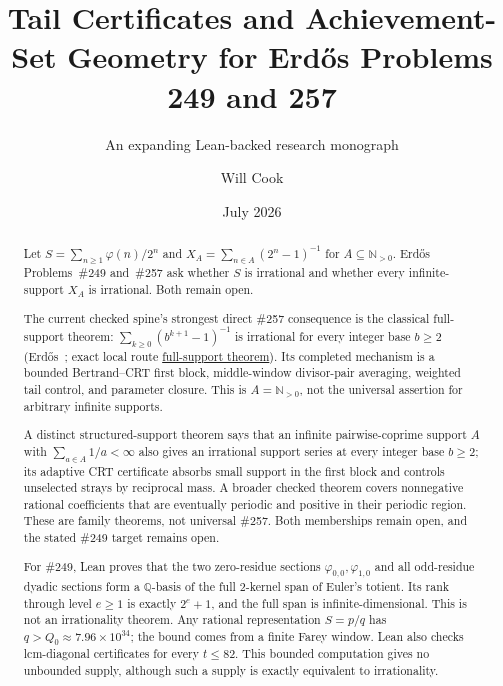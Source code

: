 \documentclass[11pt]{article}
\title{Tail Certificates and Achievement-Set Geometry for Erd\H{o}s Problems 249 and 257}
\subtitle{An expanding Lean-backed research monograph}
\author{Will Cook}
\date{July 2026}
\newcommand{\commit}{99f4bf47422abbd8757cbb22b50ba079d764d3a7}
\newcommand{\repobase}{https://github.com/wcook04/plectis-erdos/blob/\commit}
\newcommand{\PK}{Erdos249257}
\newcommand{\lword}[4]{\href{\repobase/\PK/#1\#L#2}{#4}}
\theoremstyle{definition}
\theoremstyle{remark}
\newcommand{\Npos}{\mathbb{N}_{>0}}
\newcommand{\Q}{\mathbb{Q}}
\newcommand{\ph}{\varphi}
\newcommand{\Qzero}{Q_0}
\begin{document}
\maketitle
{}

\begin{abstract}
\noindent
Let $S=\sum_{n\ge1}\ph(n)/2^n$ and
$X_A=\sum_{n\in A}(2^n-1)^{-1}$ for $A\subseteq\Npos$. Erd\H{o}s
Problems~\#249 and~\#257 ask whether $S$ is irrational and whether every
infinite-support $X_A$ is irrational. Both remain open.

The current checked spine's strongest direct \#257 consequence is the classical
full-support theorem: $\sum_{k\ge0}(b^{k+1}-1)^{-1}$ is irrational for every
integer base $b\ge2$ (Erd\H{o}s~\cite{erdos1948}; exact local route
\lword{CertificateKernel.lean}{8328}{irrational_erdosSum_full_support}{full-support theorem}).
Its completed mechanism is a bounded Bertrand--CRT first block, middle-window
divisor-pair averaging, weighted tail control, and parameter closure.  This is
$A=\Npos$, not the universal assertion for arbitrary infinite supports.

A distinct structured-support theorem says that an infinite pairwise-coprime
support $A$ with $\sum_{a\in A}1/a<\infty$ also gives an irrational support
series at every integer base $b\ge2$; its adaptive CRT certificate absorbs
small support in the first block and controls unselected strays by reciprocal
mass.  A broader checked theorem covers nonnegative rational coefficients that
are eventually periodic and positive in their periodic region.  These are
family theorems, not universal \#257.  Both memberships remain open, and the
stated \#249 target remains open.

For \#249, Lean proves that the two zero-residue sections
$\ph_{0,0},\ph_{1,0}$ and all odd-residue dyadic sections form a $\Q$-basis of
the full $2$-kernel span of Euler's totient. Its rank through level $e\ge1$
is exactly $2^e+1$, and the full span is infinite-dimensional. This is not an
irrationality theorem. Any rational representation $S=p/q$ has
$q>\Qzero\approx7.96\times10^{34}$; the bound comes from a finite Farey
window. Lean also checks lcm-diagonal certificates for every $t\le82$. This
bounded computation gives no unbounded supply, although such a supply is
exactly equivalent to irrationality.


\end{abstract}
\end{document}
